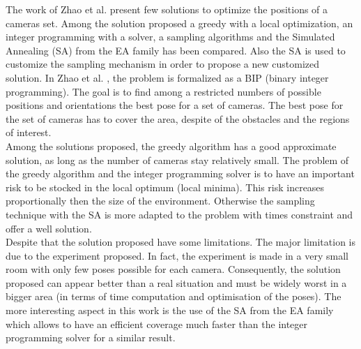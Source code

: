 The work of Zhao et al. \cite{151*zhao2013} present few solutions to optimize the positions of a cameras set. Among the solution proposed a greedy with a local optimization, an integer programming with a solver, a sampling algorithms and the Simulated Annealing (SA) from the EA family has been compared. Also the SA is used to customize the sampling mechanism in order to propose a new customized solution. 
In Zhao et al. \cite{151*zhao2013}, the problem is formalized as a BIP (binary integer programming).
  The goal is to find among a restricted numbers of possible positions and orientations the best pose for a set of cameras. The best pose for the set of cameras has to cover the area, despite of the obstacles and the regions of interest. \\
Among the solutions proposed, the greedy algorithm has a good approximate solution, as long as the number of cameras stay relatively small. The problem of the greedy algorithm and the integer programming solver is to have an important risk to be stocked in the local optimum (local minima). This risk increases proportionally then the size of the environment. Otherwise the sampling technique with the SA is more adapted to the problem with times constraint and offer a well solution.\\
Despite that the solution proposed have some limitations. The major limitation is due to the experiment proposed. In fact, the experiment is made in a very small room with only few poses possible for each camera. Consequently, the solution proposed can appear better than a real situation and must be widely worst in a bigger area (in terms of time computation and optimisation of the poses). The more interesting aspect in this work \citep{151*zhao2013} is the use of the SA from the EA family which allows to have an efficient coverage much faster than the integer programming solver for a similar result. 

